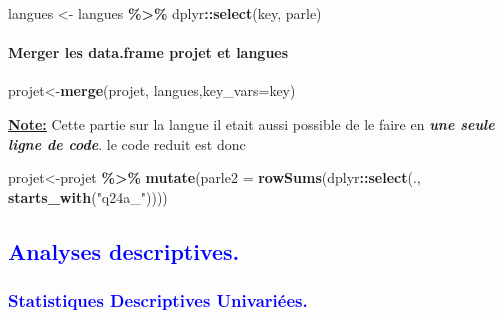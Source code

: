 \documentclass[
]{article}
\newenvironment{Shaded}{\begin{snugshade}}{\end{snugshade}}
\newcommand{\AttributeTok}[1]{\textcolor[rgb]{0.13,0.29,0.53}{#1}}
\newcommand{\FunctionTok}[1]{\textcolor[rgb]{0.13,0.29,0.53}{\textbf{#1}}}
\newcommand{\NormalTok}[1]{#1}
\newcommand{\OtherTok}[1]{\textcolor[rgb]{0.56,0.35,0.01}{#1}}
\newcommand{\SpecialCharTok}[1]{\textcolor[rgb]{0.81,0.36,0.00}{\textbf{#1}}}
\newcommand{\StringTok}[1]{\textcolor[rgb]{0.31,0.60,0.02}{#1}}
\begin{document}
\begin{Shaded}
\begin{Highlighting}[]
\NormalTok{langues }\OtherTok{\textless{}{-}}\NormalTok{ langues }\SpecialCharTok{\%\textgreater{}\%}                 
\NormalTok{                dplyr}\SpecialCharTok{::}\FunctionTok{select}\NormalTok{(key, parle)}
\end{Highlighting}
\end{Shaded}

\hfill\break

\hypertarget{merger-les-data.frame-projet-et-langues}{%
\paragraph{Merger les data.frame projet et
langues}\label{merger-les-data.frame-projet-et-langues}}

\hfill\break

\begin{Shaded}
\begin{Highlighting}[]
\NormalTok{projet}\OtherTok{\textless{}{-}}\FunctionTok{merge}\NormalTok{(projet, langues,}\AttributeTok{key\_vars=}\NormalTok{key) }
\end{Highlighting}
\end{Shaded}

\hfill\break
\ul{\textbf{Note:}} Cette partie sur la langue il etait aussi possible
de le faire en \textbf{\emph{une seule ligne de code}}. le code reduit
est donc\\

\begin{Shaded}
\begin{Highlighting}[]
\NormalTok{projet}\OtherTok{\textless{}{-}}\NormalTok{projet }\SpecialCharTok{\%\textgreater{}\%}              
           \FunctionTok{mutate}\NormalTok{(}\AttributeTok{parle2 =} \FunctionTok{rowSums}\NormalTok{(dplyr}\SpecialCharTok{::}\FunctionTok{select}\NormalTok{(., }\FunctionTok{starts\_with}\NormalTok{(}\StringTok{"q24a\_"}\NormalTok{))))}
\end{Highlighting}
\end{Shaded}

\hfill\break

\textcolor{blue}{\subsection{Analyses descriptives.}} 
\textcolor{blue}{\subsubsection{Statistiques Descriptives Univariées.}}
\end{document}
